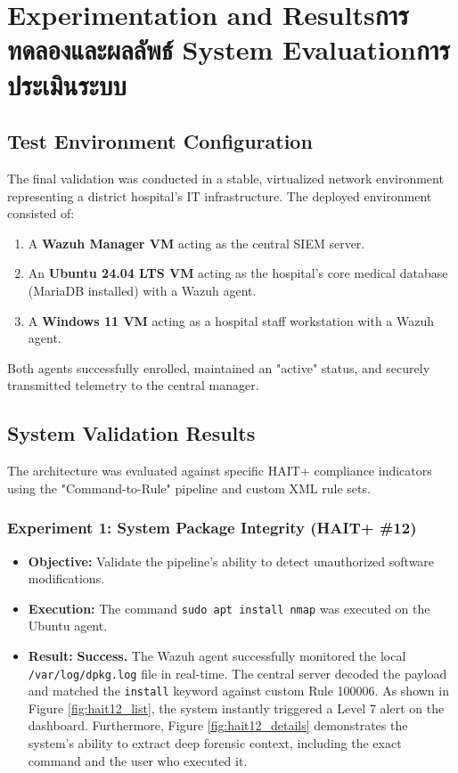 \chapter{\ifproject%
\ifenglish Experimentation and Results\else การทดลองและผลลัพธ์\fi
\else%
\ifenglish System Evaluation\else การประเมินระบบ\fi
\fi}
\label{ch:evaluation}

\section{Test Environment Configuration}
\label{sec:test-env-setup}
The final validation was conducted in a stable, virtualized network environment representing a district hospital's IT infrastructure. The deployed environment consisted of:
\begin{enumerate}
\item A \textbf{Wazuh Manager VM} acting as the central SIEM server.
\item An \textbf{Ubuntu 24.04 LTS VM} acting as the hospital's core medical database (MariaDB installed) with a Wazuh agent.
\item A \textbf{Windows 11 VM} acting as a hospital staff workstation with a Wazuh agent.
\end{enumerate}
Both agents successfully enrolled, maintained an "active" status, and securely transmitted telemetry to the central manager.

\section{System Validation Results}
\label{sec:system-validation}
The architecture was evaluated against specific HAIT+ compliance indicators using the "Command-to-Rule" pipeline and custom XML rule sets.

\subsection{Experiment 1: System Package Integrity (HAIT+ \#12)}
\label{sec:res-pkg-integrity}
\begin{itemize}
\item \textbf{Objective:} Validate the pipeline's ability to detect unauthorized software modifications.
\item \textbf{Execution:} The command \texttt{sudo apt install nmap} was executed on the Ubuntu agent.
\item \textbf{Result:} \textbf{Success.} The Wazuh agent successfully monitored the local \texttt{/var/log/dpkg.log} file in real-time. The central server decoded the payload and matched the \texttt{install} keyword against custom Rule 100006. As shown in Figure \ref{fig:hait12_list}, the system instantly triggered a Level 7 alert on the dashboard. Furthermore, Figure \ref{fig:hait12_details} demonstrates the system's ability to extract deep forensic context, including the exact command and the user who executed it.
\end{itemize}

